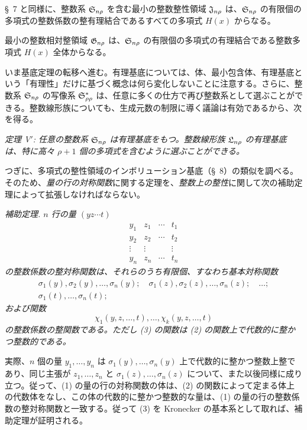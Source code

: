 \documentclass[11pt]{article}
\begin{document}
\S\ 7 と同様に、整数系 $\mathfrak{S}_{n\rho}$ を含む最小の整数整性領域 $\mathfrak{J}_{n\rho}$ は、$\mathfrak{S}_{n\rho}$ の有限個の多項式の整数係数の整有理結合であるすべての多項式 $H(x)$ からなる。

最小の整数相対整領域 $\mathfrak{G}_{n\rho}$ は、$\mathfrak{S}_{n\rho}$ の有限個の多項式の有理結合である整数多項式 $H(x)$ 全体からなる。

いま基底定理の転移へ進む。有理基底については、体、最小包含体、有理基底という「有理性」だけに基づく概念は何ら変化しないことに注意する。さらに、整数系 $\mathfrak{S}_{n\rho}$ の写像系 $\mathfrak{S}^*_{\rho\rho}$ は、任意に多くの仕方で再び整数系として選ぶことができる。整数線形族についても、生成元数の制限に導く議論は有効であるから、次を得る。

\emph{定理 V$'$: 任意の整数系 $\mathfrak{S}_{n\rho}$ は有理基底をもつ。整数線形族 $\mathfrak{L}_{n\rho}$ の有理基底は、特に高々 $\rho+1$ 個の多項式を含むように選ぶことができる。}

つぎに、多項式の整性領域のインボリューション基底（\S\ 8）の類似を調べる。そのため、\emph{量の行の対称関数}に関する定理を、\emph{整数上の整性}に関して次の補助定理によって拡張しなければならない。

\emph{補助定理. $n$ 行の量 $(yz\cdots t)$}
\begin{equation}
\begin{array}{cccc}
  y_1&z_1&\cdots&t_1\\
  y_2&z_2&\cdots&t_2\\
  \vdots&\vdots&&\vdots\\
  y_n&z_n&\cdots&t_n
\end{array}
\tag{1}
\end{equation}
\emph{の整数係数の整対称関数は、それらのうち有限個、すなわち基本対称関数}
\begin{equation}
\begin{gathered}
  \sigma_1(y),\sigma_2(y),\ldots,\sigma_n(y);\quad
  \sigma_1(z),\sigma_2(z),\ldots,\sigma_n(z);\quad\ldots;\\
  \sigma_1(t),\ldots,\sigma_n(t);
\end{gathered}
\tag{2}
\end{equation}
\emph{および関数}
\begin{equation}
  \chi_1(y,z,\ldots,t),\ldots,\chi_k(y,z,\ldots,t)
\tag{3}
\end{equation}
\emph{の整数係数の整関数である。ただし (3) の関数は (2) の関数上で代数的に整かつ整数的である。}

実際、$n$ 個の量 $y_1,\ldots,y_n$ は $\sigma_1(y),\ldots,\sigma_n(y)$ 上で代数的に整かつ整数上整であり、同じ主張が $z_1,\ldots,z_n$ と $\sigma_1(z),\ldots,\sigma_n(z)$ について、また以後同様に成り立つ。従って、(1) の量の行の対称関数の体は、(2) の関数によって定まる体上の代数体をなし、この体の代数的に整かつ整数的な量は、(1) の量の行の整数係数の整対称関数と一致する。従って (3) を Kronecker の基本系として取れば、補助定理が証明される。
\end{document}

